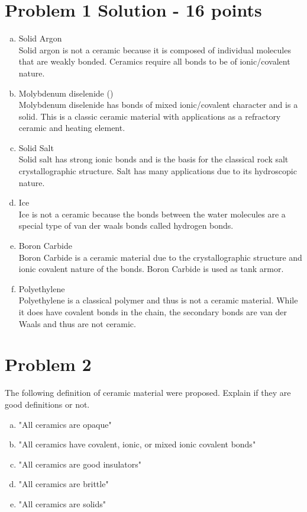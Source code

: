 \documentclass[12pt,letterpaper]{article}
\begin{document}
\section*{Problem 1 Solution - 16 points}
\begin{enumerate}[(a)]
    \item Solid Argon\\[0.2cm]
    Solid argon is not a ceramic because it is composed of individual molecules that are weakly bonded. Ceramics require all bonds to be of ionic/covalent nature.
    \item Molybdenum diselenide ()\\[0.2 cm]
    Molybdenum diselenide has bonds of mixed ionic/covalent character and is a solid. This is a classic ceramic material with applications as a refractory ceramic and heating element.
    \item Solid Salt  \\[0.2cm]
    Solid salt has strong ionic bonds and is the basis for the classical rock salt crystallographic structure. Salt has many applications due to its hydroscopic nature. 
    \item Ice \\[0.2cm]
    Ice is not a ceramic because the bonds between the water molecules are a special type of van der waals bonds called hydrogen bonds.
    \item Boron Carbide  \\[0.2cm]
    Boron Carbide is a ceramic material due to the crystallographic structure and ionic covalent nature of the bonds. Boron Carbide is used as tank armor. 
    \item Polyethylene \\[0.2cm]
    Polyethylene is a classical polymer and thus is not a ceramic material. While it does have covalent bonds in the chain, the secondary bonds are van der Waals and thus are not ceramic.  
\end{enumerate}

\newpage
\section*{Problem 2}
The following definition of ceramic material were proposed. Explain if they are good definitions or not.

\begin{enumerate}[(a)]
    \item "All ceramics are opaque"
    \item "All ceramics have covalent, ionic, or mixed ionic covalent bonds"
    \item "All ceramics are good insulators"
    \item "All ceramics are brittle"
    \item "All ceramics are solids"
\end{enumerate}
\end{document}
